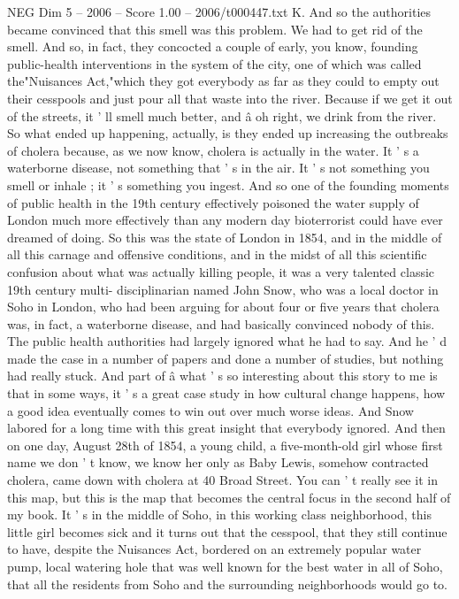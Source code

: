 \begin{textsample}{NEG Dim 5 – 2006 – Score 1.00 – 2006/t000447.txt}
K.
And so the authorities became convinced that this smell was this problem.
We had to get rid of the smell.
And so, in fact, they concocted a couple of early, you know, founding public-health interventions in the system of the city, one of which was called the"Nuisances Act,"which they got everybody as far as they could to empty out their cesspools and just pour all that waste into the river.
Because if we get it out of the streets, it ' ll smell much better, and â oh right, we drink from the river.
So what ended up happening, actually, is they ended up increasing the outbreaks of cholera because, as we now know, cholera is actually in the water.
It ' s a waterborne disease, not something that ' s in the air.
It ' s not something you smell or inhale ; it ' s something you ingest.
And so one of the founding moments of public health in the 19th century effectively poisoned the water supply of London much more effectively than any modern day bioterrorist could have ever dreamed of doing.
So this was the state of London in 1854, and in the middle of all this carnage and offensive conditions, and in the midst of all this scientific confusion about what was actually killing people, it was a very talented classic 19th century multi- disciplinarian named John Snow, who was a local doctor in Soho in London, who had been arguing for about four or five years that cholera was, in fact, a waterborne disease, and had basically convinced nobody of this.
The public health authorities had largely ignored what he had to say.
And he ' d made the case in a number of papers and done a number of studies, but nothing had really stuck.
And part of â what ' s so interesting about this story to me is that in some ways, it ' s a great case study in how cultural change happens, how a good idea eventually comes to win out over much worse ideas.
And Snow labored for a long time with this great insight that everybody ignored.
And then on one day, August 28th of 1854, a young child, a five-month-old girl whose first name we don ' t know, we know her only as Baby Lewis, somehow contracted cholera, came down with cholera at 40 Broad Street.
You can ' t really see it in this map, but this is the map that becomes the central focus in the second half of my book.
It ' s in the middle of Soho, in this working class neighborhood, this little girl becomes sick and it turns out that the cesspool, that they still continue to have, despite the Nuisances Act, bordered on an extremely popular water pump, local watering hole that was well known for the best water in all of Soho, that all the residents from Soho and the surrounding neighborhoods would go to.

\end{textsample}

